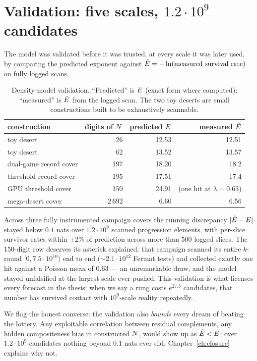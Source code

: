 \section{Validation: five scales, \texorpdfstring{$1.2\cdot10^9$}{1.2e9} candidates}\label{sec:validation}

The model was validated before it was trusted, at every scale it was
later used, by comparing the predicted exponent against
$\hat{E}=-\ln(\text{measured survival rate})$ on fully logged scans.

\begin{table}[h]
\centering\small
\caption{Density-model validation. ``Predicted'' is
$E$ (exact form where computed); ``measured'' is $\hat{E}$ from the
logged scan. The two toy deserts are small constructions built to be
exhaustively scannable.}\label{tab:validation}
\begin{tabular}{lrrr}
\toprule
construction & digits of $N$ & predicted $E$ & measured $\hat{E}$\\
\midrule
toy desert & 26 & 12.53 & 12.51\\
toy desert & 62 & 13.52 & 13.57\\
dual-game record cover & 197 & 18.20 & 18.2\\
threshold record cover & 195 & 17.51 & 17.4\\
GPU threshold cover & 150 & 24.91 & (one hit at $\lambda=0.63$)\\
mega-desert cover & 2\,692 & 6.60 & 6.56\\
\bottomrule
\end{tabular}
\end{table}

Across three fully instrumented campaign covers the running discrepancy
$|\hat{E}-E|$ stayed below $0.1$ nats over $1.2\cdot10^9$ scanned
progression elements, with per-slice survivor rates within $\pm2\%$ of
prediction across more than $500$ logged slices. The $150$-digit row
deserves its asterisk explained: that campaign scanned its entire
$k$-round $[0,7.5\cdot10^{10})$ end to end ($\sim2.1\cdot10^{12}$
Fermat tests) and collected exactly one hit against a Poisson mean of
$0.63$ --- an unremarkable draw, and the model stayed unfalsified at the
largest scale ever pushed. This validation is what licenses every
forecast in the thesis: when we say a rung costs $e^{27.3}$ candidates,
that number has survived contact with $10^9$-scale reality repeatedly.

We flag the honest converse: the validation also \emph{bounds} every
dream of beating the lottery. Any exploitable correlation between
residual complements, any hidden compositeness bias in constructed $N$,
would show up as $\hat{E}<E$; over $1.2\cdot10^9$ candidates nothing
beyond $0.1$ nats ever did. Chapter~\ref{ch:closure} explains why not.


